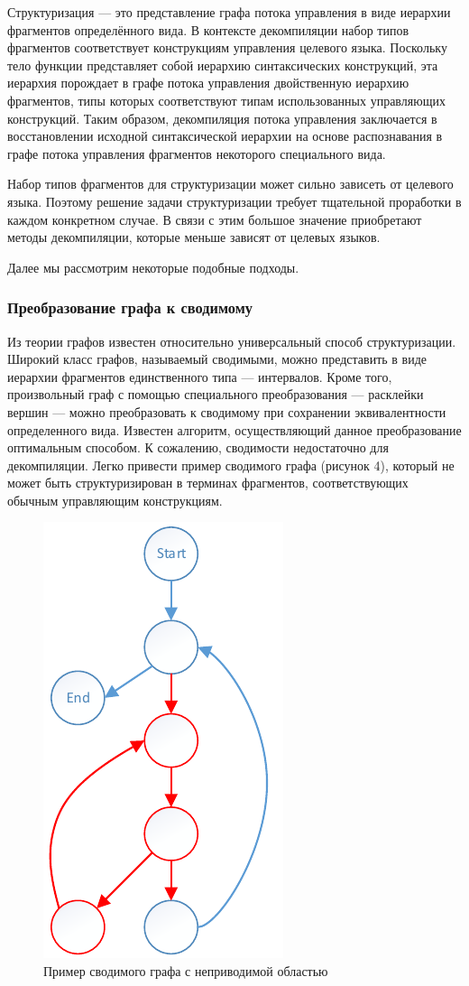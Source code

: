 \documentclass[14pt]{extarticle}
\begin{document}
Структуризация --- это представление графа потока управления в виде иерархии фрагментов определённого вида. В контексте декомпиляции набор типов фрагментов соответствует конструкциям управления целевого языка. Поскольку тело функции представляет собой иерархию синтаксических конструкций, эта иерархия порождает в графе потока управления двойственную иерархию фрагментов, типы которых соответствуют типам использованных управляющих конструкций. Таким образом, декомпиляция потока управления заключается в восстановлении исходной синтаксической иерархии на основе распознавания в графе потока управления фрагментов некоторого специального вида.

Набор типов фрагментов для структуризации может сильно зависеть от целевого языка. Поэтому решение задачи структуризации требует тщательной проработки в каждом конкретном случае. В связи с этим большое значение приобретают методы декомпиляции, которые меньше зависят от целевых языков. 

Далее мы рассмотрим некоторые подобные подходы.

\pagebreak

\subsubsection*{Преобразование графа к сводимому}
Из теории графов известен относительно универсальный способ структуризации. Широкий класс графов, называемый сводимыми, можно представить в виде иерархии фрагментов единственного типа --- интервалов. Кроме того, произвольный граф с помощью специального преобразования --- расклейки вершин --- можно преобразовать к сводимому при сохранении эквивалентности определенного вида\cite{hecht}. Известен алгоритм, осуществляющий данное преобразование оптимальным способом\cite{kasyanov}. К сожалению, сводимости недостаточно для декомпиляции. Легко привести пример сводимого графа (рисунок 4), который не может быть структуризирован в терминах фрагментов, соответствующих обычным управляющим конструкциям.  

\begin{figure}[H]
\centering \includegraphics[width=0.3\linewidth]{graph.pdf}
\caption{Пример сводимого графа с неприводимой областью}
\end{figure}
\end{document}
